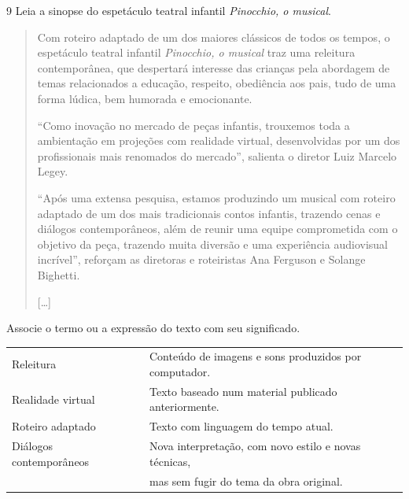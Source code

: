 

\num{9} Leia a sinopse do espetáculo teatral infantil \emph{Pinocchio, o musical}.

\begin{quote}
Com roteiro adaptado de um dos maiores clássicos de todos os tempos, o
espetáculo teatral infantil \textit{Pinocchio, o musical} traz uma releitura
contemporânea, que despertará interesse das crianças pela abordagem de
temas relacionados a educação, respeito, obediência aos pais, tudo de
uma forma lúdica, bem humorada e emocionante.

“Como inovação no mercado de peças infantis, trouxemos toda a
ambientação em projeções com realidade virtual, desenvolvidas por um dos
profissionais mais renomados do mercado”, salienta o diretor Luiz
Marcelo Legey.

“Após uma extensa pesquisa, estamos produzindo um musical com roteiro
adaptado de um dos mais tradicionais contos infantis, trazendo cenas e
diálogos contemporâneos, além de reunir uma equipe comprometida com o
objetivo da peça, trazendo muita diversão e uma experiência audiovisual
incrível”, reforçam as diretoras e roteiristas Ana Ferguson e Solange
Bighetti.

{[}\ldots{}{]}

\end{quote}

Associe o termo ou a expressão do texto com seu significado.\bigskip

\noindent\begin{tabular}{lll}
\toprule\bigskip
Releitura & & Conteúdo de imagens e sons produzidos por computador. \\ \bigskip
Realidade virtual & & Texto baseado num material publicado anteriormente. \\ \bigskip
Roteiro adaptado & & Texto com linguagem do tempo atual. \\
Diálogos contemporâneos & & Nova interpretação, com novo estilo e novas técnicas,\\
\mbox{} & & mas sem fugir do tema da obra original. \\
\bottomrule
\end{tabular}



